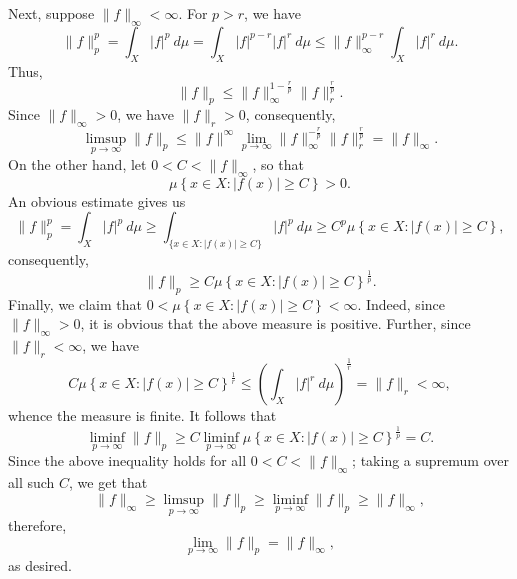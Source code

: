 \documentclass[10pt]{amsart}
\theoremstyle{thmstyle}
\theoremstyle{defstyle}
\renewcommand{\le}{\leqslant}
\renewcommand{\ge}{\geqslant}
\begin{document}
\begin{enumerate}[label=(\alph*)]
Next, suppose $\|f\|_\infty < \infty$. For $p > r$, we have 
\begin{equation*}
	\|f\|_p^p = \int_X |f|^p~d\mu = \int_X |f|^{p - r}|f|^r~d\mu\le \|f\|_\infty^{p - r}\int_X |f|^r~d\mu.
\end{equation*}
Thus, 
\begin{equation*}
	\|f\|_p\le \|f\|_\infty^{1 - \frac{r}{p}}\|f\|_r^{\frac{r}{p}}.
\end{equation*}
Since $\|f\|_\infty > 0$, we have $\|f\|_r > 0$, consequently, 
\begin{equation*}
	\limsup_{p\to\infty} \|f\|_p\le \|f\|^\infty \lim_{p\to\infty}\|f\|_\infty^{-\frac{r}{p}}\|f\|_r^{\frac{r}{p}} = \|f\|_\infty.
\end{equation*}
On the other hand, let $0 < C < \|f\|_\infty$, so that 
\begin{equation*}
	\mu\left\{x\in X\colon |f(x)|\ge C\right\} > 0.
\end{equation*}
An obvious estimate gives us 
\begin{equation*}
	\|f\|_p^p = \int_X |f|^p~d\mu\ge\int_{\{x\in X\colon |f(x)|\ge C\}}|f|^p~d\mu\ge C^p\mu\left\{x\in X\colon |f(x)|\ge C\right\},
\end{equation*}
consequently, 
\begin{equation*}
	\|f\|_p\ge C\mu\left\{x\in X\colon |f(x)|\ge C\right\}^{\frac{1}{p}}.
\end{equation*}
Finally, we claim that $0 < \mu\left\{x\in X\colon |f(x)|\ge C\right\} < \infty$. Indeed, since $\|f\|_\infty > 0$, it is obvious that the above measure is positive. Further, since $\|f\|_r < \infty$, we have 
\begin{equation*}
	C\mu\left\{x\in X\colon |f(x)|\ge C\right\}^{\frac{1}{r}}\le\left(\int_X |f|^r~d\mu\right)^{\frac{1}{r}} = \|f\|_r < \infty,
\end{equation*}
whence the measure is finite. It follows that 
\begin{equation*}
	\liminf_{p\to\infty}\|f\|_p\ge C\liminf_{p\to\infty}\mu\left\{x\in X\colon |f(x)|\ge C\right\}^{\frac{1}{p}} = C.
\end{equation*}
Since the above inequality holds for all $0 < C < \|f\|_\infty$; taking a supremum over all such $C$, we get that 
\begin{equation*}
	\|f\|_\infty\ge \limsup_{p\to\infty} \|f\|_p\ge\liminf_{p\to\infty}\|f\|_p\ge\|f\|_\infty,
\end{equation*}
therefore, 
\begin{equation*}
	\lim_{p\to\infty} \|f\|_p = \|f\|_\infty,
\end{equation*}
as desired. 


\end{enumerate}
\end{document}
